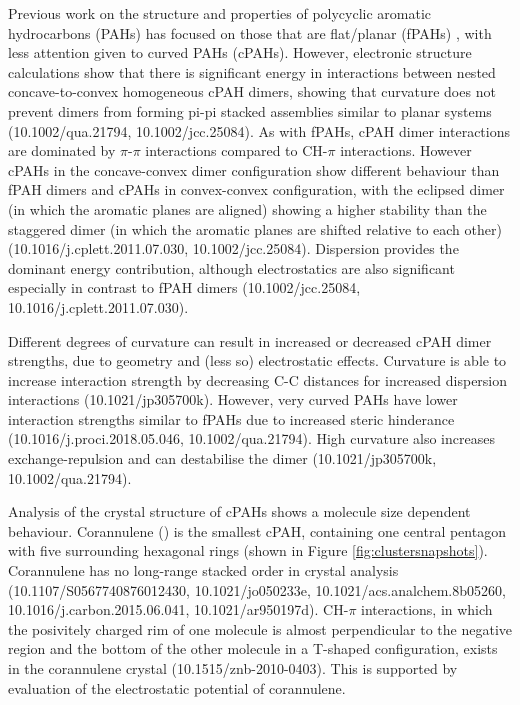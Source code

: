 Previous work on the structure and properties of polycyclic aromatic hydrocarbons (PAHs) has focused on those that are flat/planar (fPAHs) \cite{Grancic2016,chen2014size} %
, with less attention given to curved PAHs (cPAHs). However, electronic structure calculations show that there is significant energy in interactions between nested concave-to-convex homogeneous cPAH dimers, showing that curvature does not prevent dimers from forming pi-pi stacked assemblies similar to planar systems (10.1002/qua.21794, 10.1002/jcc.25084). As with fPAHs, cPAH dimer interactions are dominated by $\pi$-$\pi$ interactions compared to CH-$\pi$ interactions. However cPAHs in the concave-convex dimer configuration show different behaviour than fPAH dimers and cPAHs in convex-convex configuration, with the eclipsed dimer (in which the aromatic planes are aligned) showing a higher stability than the staggered dimer (in which the aromatic planes are shifted relative to each other) (10.1016/j.cplett.2011.07.030, 10.1002/jcc.25084).
Dispersion provides the dominant energy contribution, although electrostatics are also significant especially in contrast to fPAH dimers (10.1002/jcc.25084, 10.1016/j.cplett.2011.07.030). 

Different degrees of curvature can result in increased or decreased cPAH dimer strengths, due to geometry and (less so) electrostatic effects. Curvature is able to increase interaction strength by decreasing C-C distances for increased dispersion interactions (10.1021/jp305700k). 
However, very curved PAHs have lower interaction strengths similar to fPAHs due to increased steric hinderance (10.1016/j.proci.2018.05.046, 10.1002/qua.21794). High curvature also increases exchange-repulsion and can destabilise the dimer (10.1021/jp305700k, 10.1002/qua.21794).


Analysis of the crystal structure of cPAHs shows a molecule size dependent behaviour. Corannulene () is the smallest cPAH, containing one central pentagon with five surrounding hexagonal rings (shown in Figure \ref{fig:clustersnapshots}). Corannulene has no long-range stacked order in crystal analysis (10.1107/S0567740876012430, 10.1021/jo050233e, 10.1021/acs.analchem.8b05260, 10.1016/j.carbon.2015.06.041, 10.1021/ar950197d). 
CH-$\pi$ interactions, in which the posivitely charged rim of one molecule is almost perpendicular to the negative region and the bottom of the other molecule in a T-shaped configuration, exists in the corannulene crystal (10.1515/znb-2010-0403). This is supported by evaluation of the electrostatic potential of corannulene.

